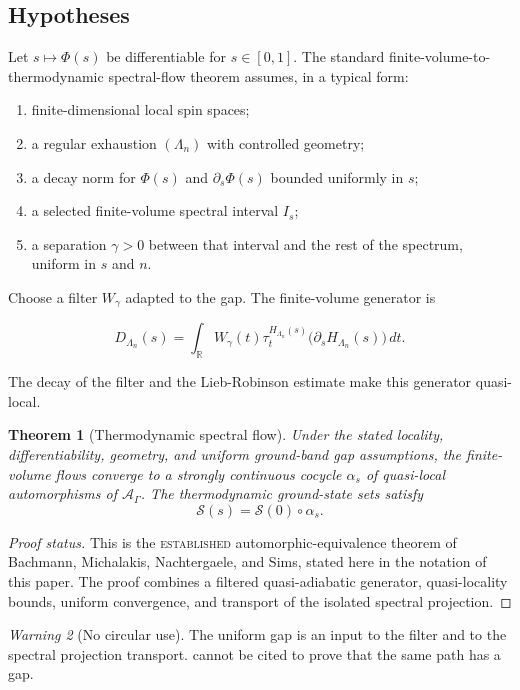 \documentclass[12pt]{article}
\newtheorem{theorem}{Theorem}[section]
\theoremstyle{definition}
\theoremstyle{remark}
\newtheorem{warning}[theorem]{Warning}
\newcommand{\A}{\mathcal A}
\newcommand{\status}[1]{\textsc{#1}}
\begin{document}
\subsection{Hypotheses}

Let $s\mapsto\Phi(s)$ be differentiable for $s\in[0,1]$. The standard
finite-volume-to-thermodynamic spectral-flow theorem assumes, in a typical
form:

\begin{enumerate}[label=(\alph*)]
  \item finite-dimensional local spin spaces;
  \item a regular exhaustion $(\Lambda_n)$ with controlled geometry;
  \item a decay norm for $\Phi(s)$ and $\partial_s\Phi(s)$ bounded uniformly
  in $s$;
  \item a selected finite-volume spectral interval $I_s$;
  \item a separation $\gamma>0$ between that interval and the rest of the
  spectrum, uniform in $s$ and $n$.
\end{enumerate}

Choose a filter $W_\gamma$ adapted to the gap. The finite-volume generator is

\[
D_{\Lambda_n}(s)
=
\int_{\mathbb R}W_\gamma(t)
\tau_t^{H_{\Lambda_n}(s)}
\bigl(\partial_sH_{\Lambda_n}(s)\bigr)
\,dt.
\]

The decay of the filter and the Lieb-Robinson estimate make this generator
quasi-local.

\begin{theorem}[Thermodynamic spectral flow]
\label{thm:spectral-flow}
Under the stated locality, differentiability, geometry, and uniform
ground-band gap assumptions, the finite-volume flows converge to a strongly
continuous cocycle $\alpha_s$ of quasi-local automorphisms of $\A_\Gamma$.
The thermodynamic ground-state sets satisfy
\[
\mathcal S(s)=\mathcal S(0)\circ\alpha_s.
\]
\end{theorem}

\begin{proof}[Proof status]
This is the \status{established} automorphic-equivalence theorem of Bachmann,
Michalakis, Nachtergaele, and Sims, stated here in the notation of this paper.
The proof combines a filtered quasi-adiabatic generator, quasi-locality bounds,
uniform convergence, and transport of the isolated spectral projection.
\end{proof}

\begin{warning}[No circular use]
The uniform gap is an input to the filter and to the spectral projection
transport.  cannot be cited to prove that the same path
has a gap.
\end{warning}
\end{document}
